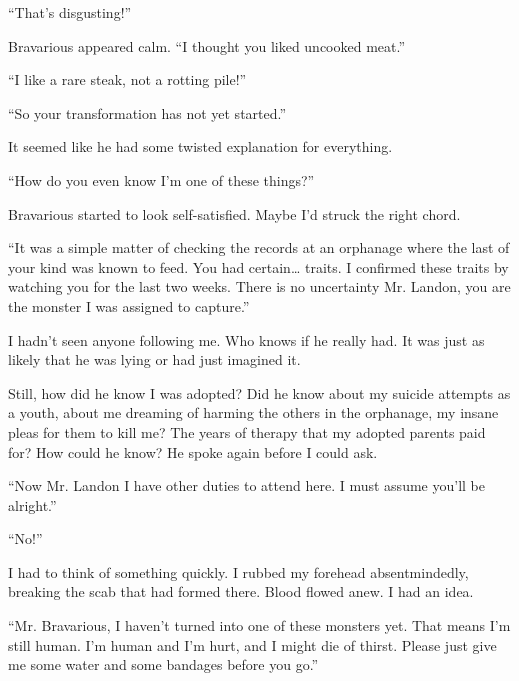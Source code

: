 ``That's disgusting!''



Bravarious appeared calm. ``I thought you liked uncooked
meat.''



``I like a rare steak, not a rotting pile!''



``So your transformation has not yet started.''



It seemed like he had some twisted explanation for
everything.



``How do you even know I'm one of these
things?''



Bravarious started to look self-satisfied. Maybe I'd struck
the right chord.



``It was a simple matter of checking the records at an
orphanage where the last of your kind was known to feed. You had
certain{\ldots} traits. I confirmed these traits by watching you
for the last two weeks. There is no uncertainty Mr. Landon, you are
the monster I was assigned to capture.''



I hadn't seen anyone following me. Who knows if he really
had. It was just as likely that he was lying or had just imagined
it.



Still, how did he know I was adopted? Did he know about my suicide
attempts as a youth, about me dreaming of harming the others in the
orphanage, my insane pleas for them to kill me? The years of
therapy that my adopted parents paid for? How could he know? He
spoke again before I could ask.



``Now Mr. Landon I have other duties to attend here. I must
assume you'll be alright.''



``No!''



I had to think of something quickly. I rubbed my forehead
absentmindedly, breaking the scab that had formed there. Blood
flowed anew. I had an idea.



``Mr. Bravarious, I haven't turned into one of these
monsters yet. That means I'm still human. I'm human and
I'm hurt, and I might die of thirst. Please just give me some
water and some bandages before you go.''



